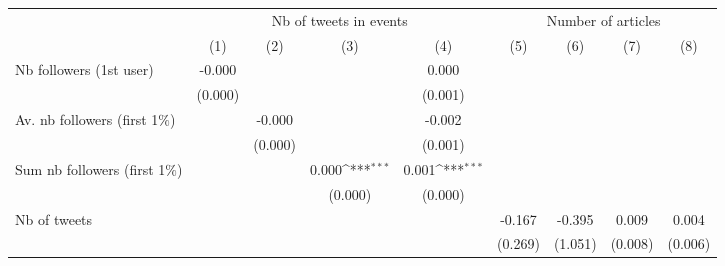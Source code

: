 {
\def\sym#1{\ifmmode^{#1}\else\(^{#1}\)\fi}
\begin{tabular}{l*{8}{c}}
\hline\hline
                    &\multicolumn{4}{c}{Nb of tweets in events}                                             &\multicolumn{4}{c}{Number of articles}                                                 \\\cmidrule(lr){2-5}\cmidrule(lr){6-9}
                    &\multicolumn{1}{c}{(1)}         &\multicolumn{1}{c}{(2)}         &\multicolumn{1}{c}{(3)}         &\multicolumn{1}{c}{(4)}         &\multicolumn{1}{c}{(5)}         &\multicolumn{1}{c}{(6)}         &\multicolumn{1}{c}{(7)}         &\multicolumn{1}{c}{(8)}         \\
\hline
Nb followers (1st user)&      -0.000         &                     &                     &       0.000         &                     &                     &                     &                     \\
                    &     (0.000)         &                     &                     &     (0.001)         &                     &                     &                     &                     \\
Av. nb followers (first 1$\%$)&                     &      -0.000         &                     &      -0.002         &                     &                     &                     &                     \\
                    &                     &     (0.000)         &                     &     (0.001)         &                     &                     &                     &                     \\
Sum nb followers (first 1$\%$)&                     &                     &       0.000\sym{***}&       0.001\sym{***}&                     &                     &                     &                     \\
                    &                     &                     &     (0.000)         &     (0.000)         &                     &                     &                     &                     \\
Nb of tweets        &                     &                     &                     &                     &      -0.167         &      -0.395         &       0.009         &       0.004         \\
                    &                     &                     &                     &                     &     (0.269)         &     (1.051)         &     (0.008)         &     (0.006)         \\

\end{tabular}}
